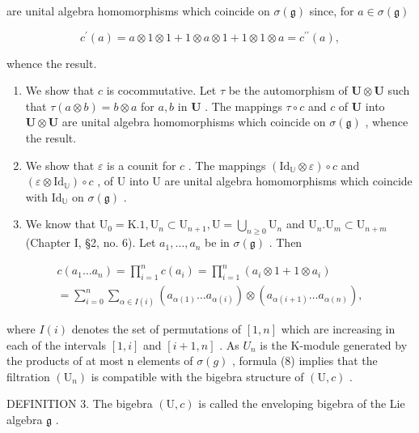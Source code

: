 are unital algebra homomorphisms which coincide on \(\sigma (\mathfrak{g})\) since, for \(a\in \sigma (\mathfrak{g})\)

\[
c ^ {\prime} (a) = a \otimes 1 \otimes 1 + 1 \otimes a \otimes 1 + 1 \otimes 1 \otimes a = c ^ {\prime \prime} (a),
\]

whence the result.

\begin{enumerate}
\def\labelenumi{(\alph{enumi})}
\setcounter{enumi}{2}
\item
  We show that \(c\) is cocommutative. Let \(\tau\) be the automorphism of \(\mathbf{U} \otimes \mathbf{U}\) such that \(\tau(a \otimes b) = b \otimes a\) for \(a, b\) in \(\mathbf{U}\) . The mappings \(\tau \circ c\) and \(c\) of \(\mathbf{U}\) into \(\mathbf{U} \otimes \mathbf{U}\) are unital algebra homomorphisms which coincide on \(\sigma(\mathfrak{g})\) , whence the result.
\item
  We show that \(\varepsilon\) is a counit for \(c\) . The mappings \((\mathrm{Id}_{\mathbb{U}} \otimes \varepsilon) \circ c\) and \((\varepsilon \otimes \mathrm{Id}_{\mathbb{U}}) \circ c\) , of U into U are unital algebra homomorphisms which coincide with \(\mathrm{Id}_{\mathbb{U}}\) on \(\sigma(\mathfrak{g})\) .
\item
  We know that \(\mathrm{U}_0 = \mathrm{K}.1, \mathrm{U}_n \subset \mathrm{U}_{n+1}, \mathrm{U} = \bigcup_{n \geqslant 0} \mathrm{U}_n\) and \(\mathrm{U}_n. \mathrm{U}_m \subset \mathrm{U}_{n+m}\) (Chapter I, §2, no. 6). Let \(a_1, \ldots, a_n\) be in \(\sigma(\mathfrak{g})\) . Then
\end{enumerate}

\[
\begin{array}{l} c (a _ {1} \ldots a _ {n}) = \prod_ {i = 1} ^ {n} c (a _ {i}) = \prod_ {i = 1} ^ {n} (a _ {i} \otimes 1 + 1 \otimes a _ {i}) \\ = \sum_ {i = 0} ^ {n} \sum_ {\alpha \in I (i)} (a _ {\alpha (1)} \ldots a _ {\alpha (i)}) \otimes (a _ {\alpha (i + 1)} \ldots a _ {\alpha (n)}), \end{array}\tag{8}
\]

where \(I(i)\) denotes the set of permutations of \([1, n]\) which are increasing in each of the intervals \([1, i]\) and \([i + 1, n]\) . As \(U_{n}\) is the K-module generated by the products of at most n elements of \(\sigma(g)\) , formula (8) implies that the filtration \((\mathrm{U}_{n})\) is compatible with the bigebra structure of \((\mathrm{U}, c)\) .

DEFINITION 3. The bigebra \((\mathrm{U}, c)\) is called the enveloping bigebra of the Lie algebra \(\mathfrak{g}\) .

